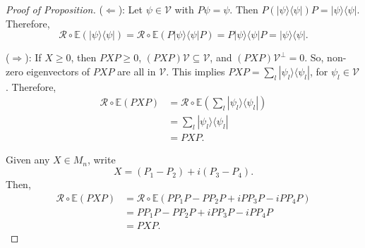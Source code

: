 \documentclass[12pt]{article}
\theoremstyle{definition}
\begin{document}
\begin{proof}[Proof of Proposition]
($\Leftarrow$): Let $\psi \in \mathcal{V}$ with $P\psi=\psi$. Then $P(|\psi\rangle\langle \psi|)P = |\psi\rangle\langle \psi|$. Therefore,
\[
\mathcal{R} \circ \mathbb{E}(|\psi\rangle\langle \psi|)=\mathcal{R} \circ \mathbb{E}(P|\psi\rangle\langle \psi|P)=P|\psi\rangle\langle \psi|P=|\psi\rangle\langle \psi|.
\]

($\Rightarrow$): If $X \geq 0$, then $PXP \geq 0$, $(PXP)\mathcal{V} \subseteq \mathcal{V}$, and $(PXP)\mathcal{V}^\perp=0$. So,
non-zero eigenvectors of $PXP$ are all in $\mathcal{V}$. This implies $PXP=\sum_l |\psi_l\rangle\langle \psi_l|$,
for $\psi_l \in \mathcal{V}$. Therefore,
\begin{align*}
\mathcal{R} \circ \mathbb{E}(PXP) &= \mathcal{R} \circ \mathbb{E}\left(\sum_l |\psi_l\rangle\langle \psi_l|\right) \\
&= \sum_l |\psi_l\rangle\langle \psi_l| \\
&= PXP.
\end{align*}

Given any $X \in M_n$, write
\[
X=(P_1-P_2)+i(P_3-P_4).
\]
Then,
\begin{align*}
\mathcal{R} \circ \mathbb{E}(PXP) &= \mathcal{R} \circ \mathbb{E}(PP_1P-PP_2P+iPP_3P-iPP_4P) \\
&= PP_1P-PP_2P+iPP_3P-iPP_4P \\
&= PXP.
\end{align*}
\end{proof}
\end{document}
